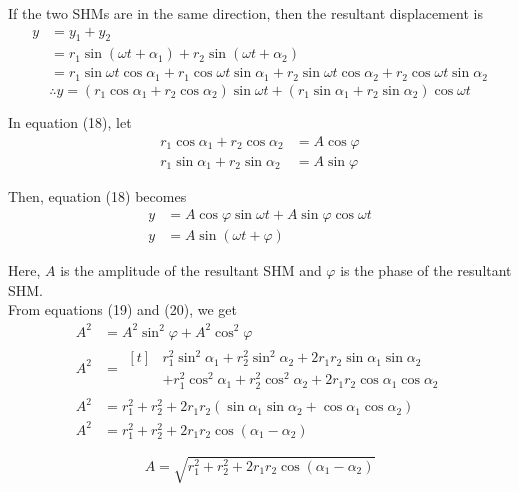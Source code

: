 \documentclass[12pt]{article}
\begin{document}
If the two SHMs are in the same direction, then the resultant displacement is
\begin{align*}
    y &= y_1 + y_2 \\
    &= r_1 \sin{(\omega t + \alpha_1)} + r_2 \sin{(\omega t + \alpha_2)} \\
    &= r_1 \sin{\omega t} \cos{\alpha_1} + r_1 \cos{\omega t} \sin{\alpha_1} + r_2 \sin{\omega t} \cos{\alpha_2} + r_2 \cos{\omega t} \sin{\alpha_2}
\end{align*}
\begin{equation}
    \therefore y = (r_1 \cos{\alpha_1} + r_2 \cos{\alpha_2}) \sin{\omega t} + (r_1 \sin{\alpha_1} + r_2 \sin{\alpha_2}) \cos{\omega t}
\end{equation}

In equation (18), let
\begin{align}
    r_1\cos{\alpha_1} + r_2\cos{\alpha_2} &= A\cos{\varphi} \\
    r_1\sin{\alpha_1} + r_2\sin{\alpha_2} &= A\sin{\varphi}
\end{align}

Then, equation (18) becomes
\begin{align}
    y &= A\cos{\varphi} \sin{\omega t} + A\sin{\varphi} \cos{\omega t} \\
    y &= A \sin{(\omega t + \varphi)}
\end{align}

Here, $A$ is the amplitude of the resultant SHM and $\varphi$ is the phase of the resultant SHM. \\

From equations (19) and (20), we get
\begin{align*}
    A^2 &= A^2 \sin^2{\varphi} + A^2 \cos^2{\varphi} \\
    A^2 &= 
    \begin{aligned}[t]
        & r_1^2 \sin^2{\alpha_1} + r_2^2 \sin^2{\alpha_2} + 2r_1r_2 \sin{\alpha_1} \sin{\alpha_2} \\
            & + r_1^2 \cos^2{\alpha_1} + r_2^2 \cos^2{\alpha_2} + 2r_1r_2 \cos{\alpha_1} \cos{\alpha_2}
    \end{aligned}\\
    A^2 &= r_1^2 + r_2^2 + 2r_1r_2(\sin{\alpha_1} \sin{\alpha_2} + \cos{\alpha_1} \cos{\alpha_2}) \\
    A^2 &= r_1^2 + r_2^2 + 2r_1r_2 \cos{(\alpha_1 - \alpha_2)}
\end{align*}

\begin{equation}
    \boxed{ A = \sqrt{r_1^2 + r_2^2 + 2r_1r_2 \cos{(\alpha_1 - \alpha_2)}} }
\end{equation}
\end{document}
